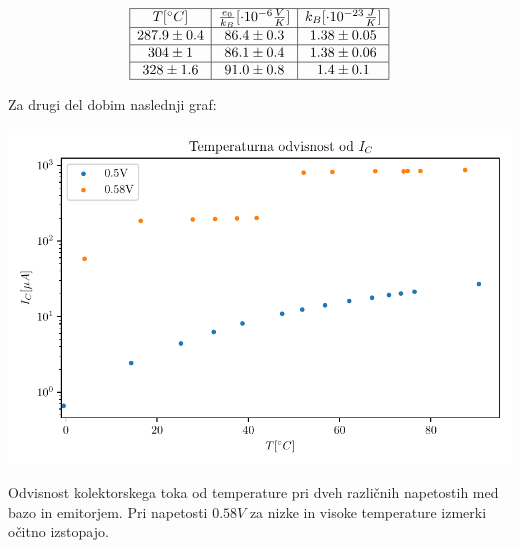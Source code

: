 \documentclass[12pt]{report}
\begin{document}
\begin{tabela}
  \centering
  \[
  \begin{array}{|c|c|c|}\hline
    T[^\circ C] & \frac{e_0}{k_B} [\cdot 10^{-6} \frac{V}{K}] & k_B [\cdot 10^{-23} \frac{J}{K}] \\ \hline 
    287.9 \pm 0.4 & 86.4 \pm 0.3 & 1.38 \pm 0.05 \\ \hline
    304 \pm 1 & 86.1 \pm 0.4 & 1.38 \pm 0.06 \\ \hline
    328 \pm 1.6 & 91.0 \pm 0.8 & 1.4 \pm 0.1 \\ \hline
  \end{array}
  \]
\end{tabela}

Za drugi del dobim naslednji graf: 

\begin{slika}
  \centering
  \includegraphics{2graf}
  \caption{\small Odvisnost kolektorskega toka od temperature pri dveh različnih napetostih med bazo in emitorjem. Pri napetosti $0.58V$ za nizke in visoke temperature izmerki očitno izstopajo.}
\end{slika}
\end{document}

